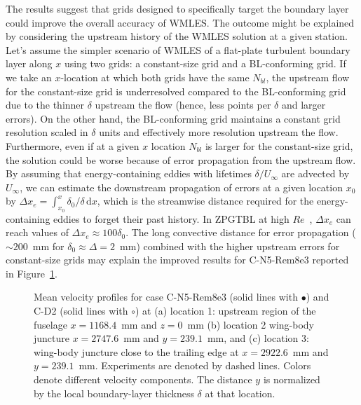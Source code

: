 \documentclass{ctr}
\begin{document}
The results suggest that grids designed to specifically target the
boundary layer could improve the overall accuracy of WMLES. The
outcome might be explained by considering the upstream history of the
WMLES solution at a given station. Let's assume the simpler scenario
of WMLES of a flat-plate turbulent boundary layer along $x$ using two
grids: a constant-size grid and a BL-conforming grid. If we take an
$x$-location at which both grids have the same $N_{bl}$, the upstream
flow for the constant-size grid is underresolved compared to the
BL-conforming grid due to the thinner $\delta$ upstream the flow
(hence, less points per $\delta$ and larger errors). On the other
hand, the BL-conforming grid maintains a constant grid resolution
scaled in $\delta$ units and effectively more resolution upstream the
flow. Furthermore, even if at a given $x$ location $N_{bl}$ is larger
for the constant-size grid, the solution could be worse because of
error propagation from the upstream flow.  By assuming that
energy-containing eddies with lifetimes $\delta/U_\infty$ are advected
by $U_\infty$, we can estimate the downstream propagation of errors at
a given location $x_0$ by $\Delta x_e = \int_{x_0}^x \delta_0/\delta
\, \mathrm{d}x$, which is the streamwise distance required for the
energy-containing eddies to forget their past history. In ZPGTBL at
high $Re$~\citep{Sillero2013}, $\Delta x_e$ can reach values of
$\Delta x_e \approx 100\delta_0$. The long convective distance for
error propagation ($\sim 200$~mm for $\delta_0 \approx \Delta=2$~mm)
combined with the higher upstream errors for constant-size grids may
explain the improved results for C-N5-Rem8e3 reported in
Figure~\ref{fig:custom}.
%
\begin{figure}
\begin{center}
  \hspace{0.05cm}
  \hspace{0.05cm}
\end{center}
\caption{Mean velocity profiles for case C-N5-Rem8e3 (solid lines with
  $\bullet$) and C-D2 (solid lines with $\circ$) at (a) location
  1: upstream region of the fuselage $x=1168.4$~mm and $z=0$~mm (b)
  location 2 wing-body juncture $x=2747.6$~mm and $y=239.1$~mm, and (c)
  location 3: wing-body juncture close to the trailing edge at
  $x=2922.6$~mm and $y=239.1$~mm.  Experiments are denoted by dashed
  lines. Colors denote different velocity components. The distance $y$
  is normalized by the local boundary-layer thickness $\delta$ at that
  location.\label{fig:custom}}
\end{figure}
\end{document}
